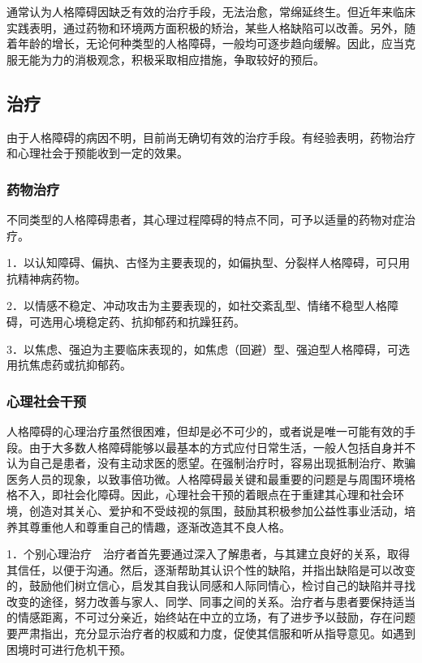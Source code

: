 通常认为人格障碍因缺乏有效的治疗手段，无法治愈，常绵延终生。但近年来临床实践表明，通过药物和环境两方面积极的矫治，某些人格缺陷可以改善。另外，随着年龄的增长，无论何种类型的人格障碍，一般均可逐步趋向缓解。因此，应当克服无能为力的消极观念，积极采取相应措施，争取较好的预后。

\subsection{治疗}

由于人格障碍的病因不明，目前尚无确切有效的治疗手段。有经验表明，药物治疗和心理社会于预能收到一定的效果。

\subsubsection{药物治疗}

不同类型的人格障碍患者，其心理过程障碍的特点不同，可予以适量的药物对症治疗。

1．以认知障碍、偏执、古怪为主要表现的，如偏执型、分裂样人格障碍，可只用抗精神病药物。

2．以情感不稳定、冲动攻击为主要表现的，如社交紊乱型、情绪不稳型人格障碍，可选用心境稳定药、抗抑郁药和抗躁狂药。

3．以焦虑、强迫为主要临床表现的，如焦虑（回避）型、强迫型人格障碍，可选用抗焦虑药或抗抑郁药。

\subsubsection{心理社会干预}

人格障碍的心理治疗虽然很困难，但却是必不可少的，或者说是唯一可能有效的手段。由于大多数人格障碍能够以最基本的方式应付日常生活，一般人包括自身并不认为自己是患者，没有主动求医的愿望。在强制治疗时，容易出现抵制治疗、欺骗医务人员的现象，以致事倍功微。人格障碍最关键和最重要的问题是与周围环境格格不入，即社会化障碍。因此，心理社会干预的着眼点在于重建其心理和社会环境，创造对其关心、爱护和不受歧视的氛围，鼓励其积极参加公益性事业活动，培养其尊重他人和尊重自己的情趣，逐渐改造其不良人格。

1．个别心理治疗　治疗者首先要通过深入了解患者，与其建立良好的关系，取得其信任，以便于沟通。然后，逐渐帮助其认识个性的缺陷，并指出缺陷是可以改变的，鼓励他们树立信心，启发其自我认同感和人际同情心，检讨自己的缺陷并寻找改变的途径，努力改善与家人、同学、同事之间的关系。治疗者与患者要保持适当的情感距离，不可过分亲近，始终站在中立的立场，有了进步予以鼓励，存在问题要严肃指出，充分显示治疗者的权威和力度，促使其信服和听从指导意见。如遇到困境时可进行危机干预。

